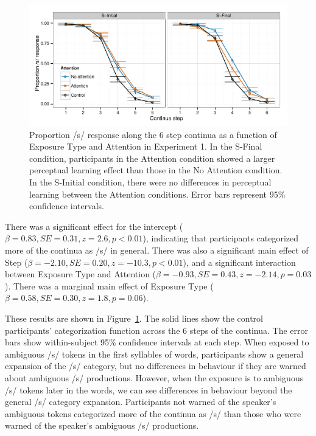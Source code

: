 \begin{figure}[!ht]
\caption{Proportion /s/ response along the 6 step continua as a function of Exposure Type and Attention in Experiment 1.    In the S-Final condition, participants in the Attention condition showed a larger perceptual learning effect than those in the No Attention condition.  In the S-Initial condition, there were no differences in perceptual learning between the Attention conditions. Error bars represent 95\% confidence intervals.}
\label{fig:exp1categ}
\begin{center}
\includegraphics[width=\textwidth]{graphs/exp1_categresults}
\end{center}
\end{figure}

There was a significant effect for the intercept ($\beta = 0.83, SE = 0.31, z = 2.6, p < 0.01$), indicating that participants categorized more of the continua as /s/ in general.  There was also a significant main effect of Step ($\beta = -2.10, SE = 0.20, z = -10.3, p < 0.01$), and a significant interaction between Exposure Type and Attention ($\beta = -0.93, SE = 0.43, z = -2.14, p = 0.03$).  There was a marginal main effect of Exposure Type ($\beta =0.58, SE = 0.30, z = 1.8, p = 0.06$).  

These results are shown in Figure~\ref{fig:exp1categ}.  
The solid lines show the control participants' categorization function across the 6 steps of the continua.  
The error bars show within-subject 95\% confidence intervals at each step.  
When exposed to ambiguous /s/ tokens in the first syllables of words, participants show a general expansion of the /s/ category, but no differences in behaviour if they are warned about ambiguous /s/ productions.  
However, when the exposure is to ambiguous /s/ tokens later in the words, we can see differences in behaviour beyond the general /s/ category expansion.  
Participants not warned of the speaker's ambiguous tokens categorized more of the continua as /s/ than those who were warned of the speaker's ambiguous /s/ productions.

